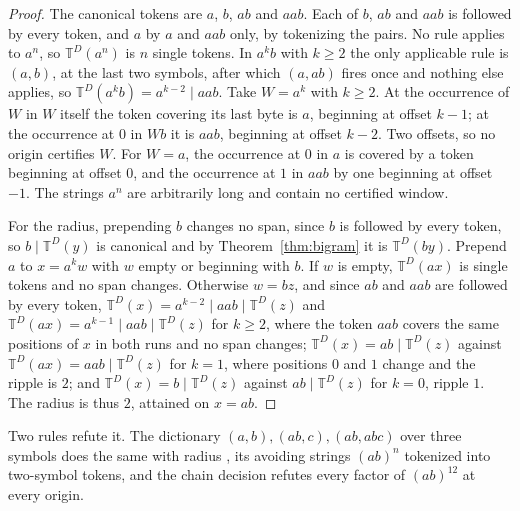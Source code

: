 \documentclass[11pt,a4paper]{article}
\theoremstyle{definition}
\theoremstyle{plain}
\newcommand{\T}{\mathbb{T}}
\begin{document}
\begin{proof}
The canonical tokens are \(a\), \(b\), \(ab\) and \(aab\). Each of \(b\), \(ab\) and \(aab\) is followed by every token,
and \(a\) by \(a\) and \(aab\) only, by tokenizing the pairs. No rule applies to \(a^n\), so \(\T^D(a^n)\) is \(n\)
single tokens. In \(a^k b\) with \(k \ge 2\) the only applicable rule is \((a, b)\), at the last two symbols, after
which \((a, ab)\) fires once and nothing else applies, so \(\T^D(a^k b) = a^{k-2} \mid aab\). Take \(W = a^k\) with
\(k \ge 2\). At the occurrence of \(W\) in \(W\) itself the token covering its last byte is \(a\), beginning at offset
\(k - 1\); at the occurrence at \(0\) in \(Wb\) it is \(aab\), beginning at offset \(k - 2\). Two offsets, so no origin
certifies \(W\). For \(W = a\), the occurrence at \(0\) in \(a\) is covered by a token beginning at offset \(0\), and
the occurrence at \(1\) in \(aab\) by one beginning at offset \(-1\). The strings \(a^n\) are arbitrarily long and
contain no certified window.

For the radius, prepending \(b\) changes no span, since \(b\) is followed by every token, so \(b \mid \T^D(y)\) is
canonical and by Theorem~\ref{thm:bigram} it is \(\T^D(by)\). Prepend \(a\) to \(x = a^k w\) with \(w\) empty or
beginning with \(b\). If \(w\) is empty, \(\T^D(ax)\) is single tokens and no span changes. Otherwise \(w = bz\), and
since \(ab\) and \(aab\) are followed by every token, \(\T^D(x) = a^{k-2} \mid aab \mid \T^D(z)\) and
\(\T^D(ax) = a^{k-1} \mid aab \mid \T^D(z)\) for \(k \ge 2\), where the token \(aab\) covers the same positions of \(x\)
in both runs and no span changes; \(\T^D(x) = ab \mid \T^D(z)\) against \(\T^D(ax) = aab \mid \T^D(z)\) for \(k = 1\),
where positions \(0\) and \(1\) change and the ripple is \(2\); and \(\T^D(x) = b \mid \T^D(z)\) against
\(ab \mid \T^D(z)\) for \(k = 0\), ripple \(1\). The radius is thus \(2\), attained on \(x = ab\).
\end{proof}

Two rules refute it. The dictionary \((a, b), (ab, c), (ab, abc)\) over three symbols does the same with radius
\DensityBRadius{}, its avoiding strings \((ab)^n\) tokenized into two-symbol tokens, and the chain decision refutes
every factor of \((ab)^{12}\) at every origin.
\end{document}
